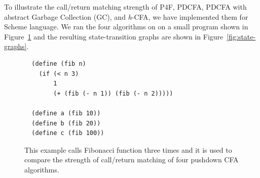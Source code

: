 \documentclass{article}
\begin{document}
To illustrate the call/return matching strength of P4F, PDCFA, PDCFA with abstract Garbage Collection (GC), and \textit{h}-CFA, we have
implemented them for Scheme language. We ran the four algorithms on on a small program shown in Figure~\ref{fig:fib} and
the resulting state-transition graphs are shown in Figure~\ref{fig:state-graphs}.

\begin{figure}
  \small
  \begin{lstlisting}
  (define (fib n)
    (if (< n 3)
        1
        (+ (fib (- n 1)) (fib (- n 2)))))

  (define a (fib 10))
  (define b (fib 20))
  (define c (fib 100))
  \end{lstlisting}
\caption{
This example calls Fibonacci function three times
and it is used to compare the strength of call/return matching of four pushdown CFA algorithms.
}
\label{fig:fib}
\end{figure}
\end{document}
